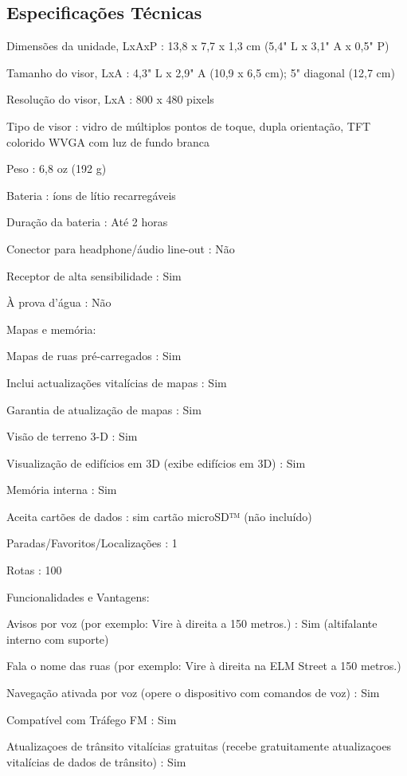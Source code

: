 \subsection{Especificações Técnicas}

Dimensões da unidade, LxAxP : 13,8 x 7,7 x 1,3 cm (5,4" L x 3,1" A x 0,5" P)

Tamanho do visor, LxA : 4,3" L x 2,9" A (10,9 x 6,5 cm); 5" diagonal (12,7 cm)

Resolução do visor, LxA : 800 x 480 pixels

Tipo de visor : vidro de múltiplos pontos de toque, dupla orientação, TFT colorido WVGA com luz de fundo branca

Peso : 6,8 oz (192 g)

Bateria : íons de lítio recarregáveis

Duração da bateria : Até 2 horas

Conector para headphone/áudio line-out : Não

Receptor de alta sensibilidade : Sim

À prova d'água : Não

Mapas e memória:

Mapas de ruas pré-carregados : Sim

Inclui actualizações vitalícias de mapas : Sim

Garantia de atualização de mapas : Sim

Visão de terreno 3-D : Sim

Visualização de edifícios em 3D (exibe edifícios em 3D) : Sim

Memória interna : Sim

Aceita cartões de dados : sim cartão microSD™ (não incluído)

Paradas/Favoritos/Localizações : 1

Rotas : 100

Funcionalidades e Vantagens:

Avisos por voz (por exemplo: Vire à direita a 150 metros.) : Sim (altifalante interno com suporte)

Fala o nome das ruas (por exemplo: Vire à direita na ELM Street a 150 metros.)

Navegação ativada por voz (opere o dispositivo com comandos de voz) : Sim

Compatível com Tráfego FM : Sim

Atualizaçoes de trânsito vitalícias gratuitas (recebe gratuitamente atualizaçoes vitalícias de dados de trânsito) : Sim

